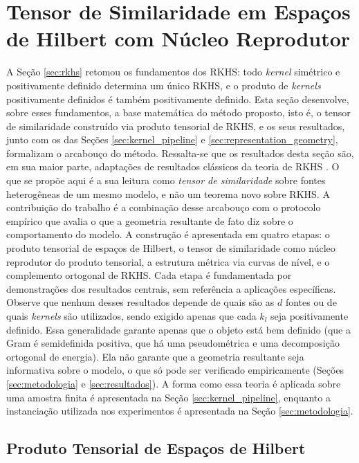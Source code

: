 \section{Tensor de Similaridade em Espaços de Hilbert com Núcleo Reprodutor}\label{sec:tensor_rkhs}

A Seção \ref{sec:rkhs} retomou os fundamentos dos RKHS: todo \textit{kernel} simétrico e positivamente definido determina um único RKHS, e o produto de \textit{kernels} positivamente definidos é também positivamente definido. Esta seção desenvolve, sobre esses fundamentos, a base matemática do método proposto, isto é, o tensor de similaridade construído via produto tensorial de RKHS, e os seus resultados, junto com os das Seções \ref{sec:kernel_pipeline} e \ref{sec:representation_geometry}, formalizam o arcabouço do método. Ressalta-se que os resultados desta seção são, em sua maior parte, adaptações de resultados clássicos da teoria de RKHS \citep{Aronszajn1950, BerlinetThomas2004, PaulsenRaghupathi2016}. O que se propõe aqui é a sua leitura como \emph{tensor de similaridade} sobre fontes heterogêneas de um mesmo modelo, e não um teorema novo sobre RKHS. A contribuição do trabalho é a combinação desse arcabouço com o protocolo empírico que avalia o que a geometria resultante de fato diz sobre o comportamento do modelo. A construção é apresentada em quatro etapas: o produto tensorial de espaços de Hilbert, o tensor de similaridade como núcleo reprodutor do produto tensorial, a estrutura métrica via curvas de nível, e o complemento ortogonal de RKHS. Cada etapa é fundamentada por demonstrações dos resultados centrais, sem referência a aplicações específicas. Observe que nenhum desses resultados depende de quais são as $d$ fontes ou de quais \textit{kernels} são utilizados, sendo exigido apenas que cada $k_l$ seja positivamente definido. Essa generalidade garante apenas que o objeto está bem definido (que a Gram é semidefinida positiva, que há uma pseudométrica e uma decomposição ortogonal de energia). Ela não garante que a geometria resultante seja informativa sobre o modelo, o que só pode ser verificado empiricamente (Seções \ref{sec:metodologia} e \ref{sec:resultados}). A forma como essa teoria é aplicada sobre uma amostra finita é apresentada na Seção \ref{sec:kernel_pipeline}, enquanto a instanciação utilizada nos experimentos é apresentada na Seção \ref{sec:metodologia}.

\subsection{Produto Tensorial de Espaços de Hilbert}

